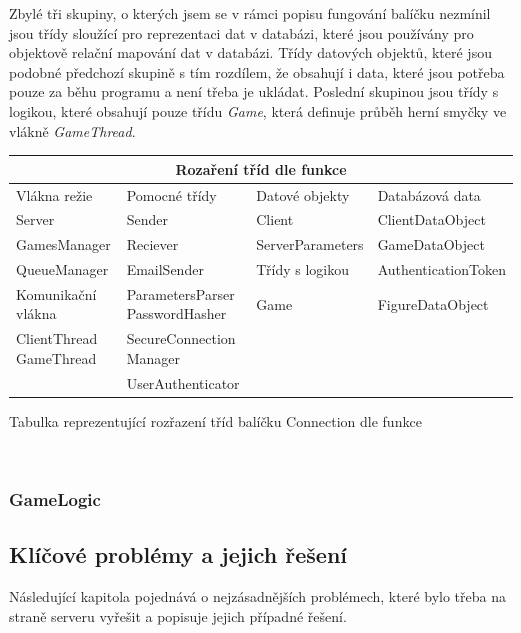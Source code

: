 \documentclass[12pt]{article}
\begin{document}
Zbylé tři skupiny, o kterých jsem se v rámci popisu fungování balíčku nezmínil jsou třídy sloužící pro reprezentaci dat v databázi, které jsou používány pro objektově relační mapování dat v databázi. Třídy datových objektů, které jsou podobné předchozí skupině s tím rozdílem, že obsahují i data, které jsou potřeba pouze za běhu programu a není třeba je ukládat. Poslední skupinou jsou třídy s logikou, které obsahují pouze třídu \textit{Game}, která definuje průběh herní smyčky ve vlákně \textit{GameThread}.
\begin{listing}[!ht]
\begin{tabular}{ |p{3cm}|p{}|p{}|p{4cm}| }
\hline
\multicolumn{4}{|c|}{Rozaření tříd dle funkce} \\
\hline
 Vlákna režie& Pomocné třídy & Datové objekty & Databázová data \\
\hline
Server & Sender &Client &ClientDataObject\\
GamesManager & Reciever  & ServerParameters &  GameDataObject\\
\cline{3-3} QueueManager&EmailSender& Třídy s logikou & AuthenticationToken   \\
\cline{1-1} \cline{3-3} Komunikační vlákna & ParametersParser PasswordHasher & Game & FigureDataObject \\
\cline{1-1} ClientThread GameThread& SecureConnection Manager& &\\
& UserAuthenticator & &\\
\hline
\end{tabular}
\caption{Tabulka reprezentující rozřazení tříd balíčku Connection dle funkce}
\end{listing}
\
\newpage
\subsubsection{GameLogic}
\newpage
\subsection{Klíčové problémy a jejich řešení}
Následující kapitola pojednává o nejzásadnějších problémech, které bylo třeba na straně serveru vyřešit a popisuje jejich případné řešení.
\end{document}
